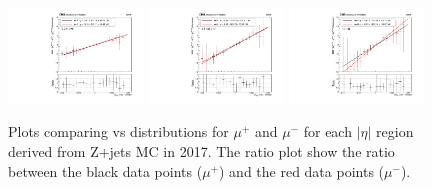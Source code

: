 \begin{figure}[h!]
    \centering
    \includegraphics[width=0.32\textwidth]{images_geofit/muCharge_eta_0_0p9_2017.pdf}
    \includegraphics[width=0.32\textwidth]{images_geofit/muCharge_eta_0p9_1p7_2017.pdf}
    \includegraphics[width=0.32\textwidth]{images_geofit/muCharge_eta_1p7_inf_2017.pdf}
    \caption{Plots comparing \dptoverptsquare vs \dzeroBS distributions for $\mu^+$ and $\mu^-$ for each $|\eta|$ region derived from Z+jets MC in 2017. The ratio plot show the ratio between the black data points ($\mu^+$) and the red data points ($\mu^-$).}
    \label{fig:muCharge_d0_2017}
\end{figure}

